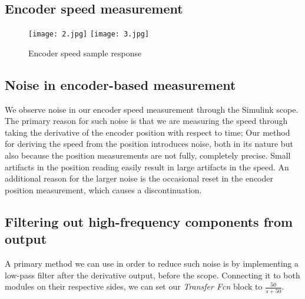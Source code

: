 \documentclass{article}
\begin{document}
\subsection{Encoder speed measurement} 

\begin{figure}[H]
    \centering
    \texttt{[image: 2.jpg]}
    \texttt{[image: 3.jpg]}
    \centering
    \caption{Encoder speed sample response}
    \label{fig:2}
\end{figure}

\subsection{Noise in encoder-based measurement}
We observe noise in our encoder speed measurement through the Simulink scope. The primary reason for such noise is that we are measuring the speed through taking the derivative of the encoder position with respect to time; Our method for deriving the speed from the position introduces noise, both in its nature but also because the position measurements are not fully, completely precise. Small artifacts in the position reading easily result in large artifacts in the speed. An additional reason for the larger noise is the occasional reset in the encoder position measurement, which causes a discontinuation.

\subsection{Filtering out high-frequency components from output}
A primary method we can use in order to reduce such noise is by implementing a low-pass filter after the derivative output, before the scope. Connecting it to both modules on their respective sides, we can set our \textit{Transfer Fcn} block to $\frac{50}{s+50}$.
\end{document}
